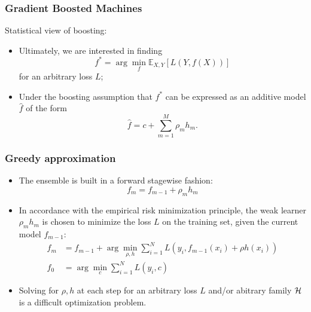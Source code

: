 \documentclass{beamer}
\begin{document}
\begin{frame}
  \frametitle{Gradient Boosted Machines \citep{friedman:2001}}

  Statistical view of boosting:

  \begin{itemize}
      \item Ultimately, we are interested in finding
      $$f^* = \arg \min_f \mathbb{E}_{X,Y} [L(Y,f(X))]$$
      for an arbitrary loss $L$;
      \item Under the boosting assumption that $f^*$ can be expressed as an additive model $\hat{f}$ of the form
      $$\hat{f} =  c + \sum_{m=1}^M \rho_m h_m.$$
  \end{itemize}

\end{frame}


\begin{frame}
  \frametitle{Greedy approximation}

  \begin{itemize}
      \item The ensemble is built in a forward stagewise fashion:
      $$f_m = f_{m-1} + \rho_m h_m$$
      \item In accordance with the empirical risk minimization principle,
      the weak learner $\rho_m h_m$ is chosen to minimize the
      loss $L$ on the training set, given the current model $f_{m-1}$:
      \begin{align*}
          f_m & = f_{m-1} + \arg \min_{\rho,h} \sum_{i=1}^N L(y_i, f_{m-1}(x_i) + \rho h(x_i)) \\
          f_0 &= \arg \min_c\sum_{i=1}^N L(y_i, c)
      \end{align*}
      \item Solving for $\rho, h$ at each step for an arbitrary loss $L$
      and/or abitrary family ${\cal H}$  is a difficult optimization problem.
  \end{itemize}

\end{frame}
\end{document}
